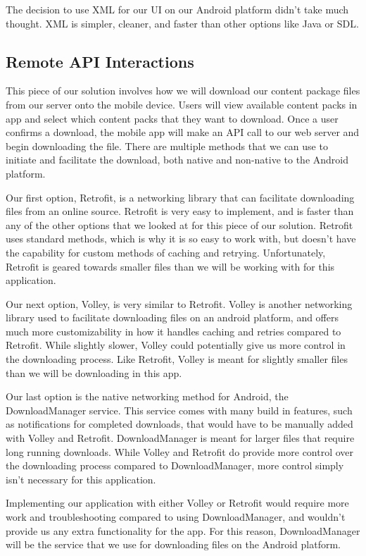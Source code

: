 \documentclass[letterpaper, 10pt,titlepage]{article}
\begin{document}
The decision to use XML for our UI on our Android platform didn’t take much thought. XML is simpler, cleaner, and faster than other options like Java or SDL. 

\subsection{Remote API Interactions}
This piece of our solution involves how we will download our content package files from our server onto the mobile device. Users will view available content packs in app and select which content packs that they want to download. Once a user confirms a download, the mobile app will make an API call to our web server and begin downloading the file. There are multiple methods that we can use to initiate and facilitate the download, both native and non-native to the Android platform. 


Our first option, Retrofit, is a networking library that can facilitate downloading files from an online source. Retrofit is very easy to implement, and is faster than any of the other options that we looked at for this piece of our solution. Retrofit uses standard methods, which is why it is so easy to work with, but doesn’t have the capability for custom methods of caching and retrying. Unfortunately, Retrofit is geared towards smaller files than we will be working with for this application. 


Our next option, Volley, is very similar to Retrofit. Volley is another networking library used to facilitate downloading files on an android platform, and offers much more customizability in how it handles caching and retries compared to Retrofit. While slightly slower, Volley could potentially give us more control in the downloading process. Like Retrofit, Volley is meant for slightly smaller files than we will be downloading in this app.


Our last option is the native networking method for Android, the DownloadManager service. This service comes with many build in features, such as notifications for completed downloads, that would have to be manually added with Volley and Retrofit. DownloadManager is meant for larger files that require long running downloads. While Volley and Retrofit do provide more control over the downloading process compared to DownloadManager, more control simply isn’t necessary for this application. 


Implementing our application with either Volley or Retrofit would require more work and troubleshooting compared to using DownloadManager, and wouldn’t provide us any extra functionality for the app. For this reason, DownloadManager will be the service that we use for downloading files on the Android platform. 
\end{document}
